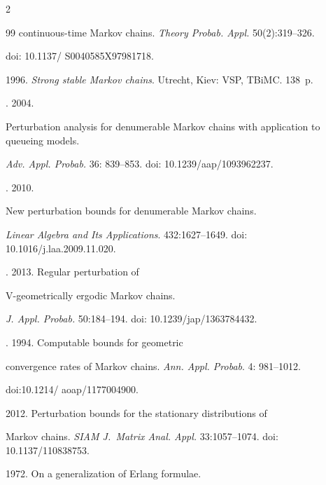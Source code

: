 \begin{multicols}{2}
{{\begin{thebibliography}{99}
continuous-time Markov chains. \textit{Theory Probab. Appl.} 50(2):319--326. 

doi: 10.1137/ S0040585X97981718.




 1996. \textit{Strong stable Markov chains}. Utrecht, Kiev: VSP, TBiMC. 138~p.


. 2004.

Perturbation analysis for denumerable Markov chains with application to queueing models.

\textit{Adv. Appl. Probab.} 36: 839--853. doi: 10.1239/aap/1093962237.




. 2010.

New perturbation bounds for denumerable Markov chains.

\textit{Linear Algebra and Its Applications}. 432:1627--1649. doi: 10.1016/j.laa.2009.11.020.




. 2013.  Regular perturbation of

V-geometrically ergodic Markov chains. 

\textit{J. Appl. Probab.} 50:184--194. doi: 10.1239/jap/1363784432.




. 1994. Computable bounds for geometric

convergence rates of Markov chains. \textit{Ann. Appl. Probab}. 4: 981--1012. 

doi:10.1214/ aoap/1177004900.


 2012. Perturbation bounds for the stationary distributions of

Markov chains. \textit{SIAM J.~Matrix Anal. Appl.} 33:1057--1074. doi: 10.1137/110838753.




 1972. On a generalization of Erlang formulae.


\end{thebibliography}}}
\end{multicols}
